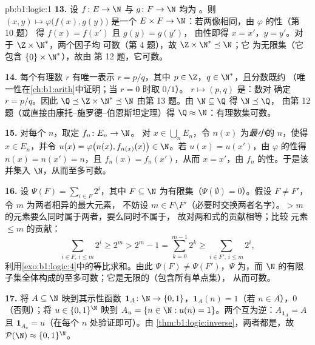 \begin{solution}{pb:b1:logic:1}
\textbf{13.} 设 $f \colon E \to \N$ 与 $g \colon F \to \N$ 均为
。则 $(x, y) \mapsto \varphi\bigl(f(x), g(y)\bigr)$ 是一个
 $E \times F \to \N$：若两像相同，由 $\varphi$ 的性（第 10 题）
得 $f(x) = f(x')$ 且 $g(y) = g(y')$，
由性即得 $x = x'$，$y = y'$。对于 $\Z \times \N^*$，两个因子均
可数（第 4 题），故 $\Z \times \N^* \preceq \N$；它
为无限集（它包含 $\{0\} \times \N^*$），故由
第 12 题，它可数。

\textbf{14.} 每个有理数 $r$ 有唯一表示 $r =
p/q$，其中 $p \in \Z$，$q \in \N^*$，且分数既约
（唯一性在\cref{ch:b1:arith}中证明；当 $r = 0$ 时取
$0/1$）。 $r \mapsto (p, q)$ 是：数对
确定 $r = p/q$。因此 $\Q \preceq \Z \times \N^* \preceq \N$
由第 13 题。由 $\N \subseteq \Q$ 得 $\N \preceq \Q$，
由第 12 题（或直接由康托–施罗德–伯恩斯坦定理）得 $\Q
\approx \N$：有理数集可数。

\textbf{15.} 对每个 $n$，取定 $f_n \colon E_n \to \N$。
对 $x \in \bigcup_n E_n$，令 $n(x)$ 为\emph{最小}的 $n$，使得
$x \in E_n$，并令 $u(x) = \varphi\bigl(n(x), f_{n(x)}(x)\bigr)
\in \N$。若 $u(x) = u(x')$，由 $\varphi$ 的性得 $n(x) =
n(x') = n$，且 $f_n(x) = f_n(x')$，从而
$x = x'$，由 $f_n$ 的性。于是该并集入 $\N$，从而至多可数。

\textbf{16.} 设 $\Psi(F) = \sum_{i \in F} 2^i$，其中 $F \subseteq \N$
为有限集（$\Psi(\emptyset) = 0$）。假设 $F \neq F'$，令 $m$ 为两者相异的最大元素，
不妨设 $m \in F \setminus
F'$（必要时交换两者名字）。$> m$ 的元素要么同时属于两者，要么同时不属于，
故对两和式的贡献相等；比较
元素 $\leq m$ 的贡献：
\[
\sum_{i \in F,\, i \leq m} 2^i \geq 2^m
> 2^m - 1 = \sum_{k=0}^{m-1} 2^k
\geq \sum_{i \in F',\, i \leq m} 2^i ,
\]
利用\cref{exo:b1:logic:4}中的等比求和。由此 $\Psi(F)
\neq \Psi(F')$，$\Psi$ 为，而
$\N$ 的有限子集全体构成的至多可数；它是无限的（包含所有单点集），
从而可数。

\textbf{17.} 将 $A \subseteq \N$ 映到其示性函数 $\mathbf 1_A
\colon \N \to \{0,1\}$，$\mathbf 1_A(n) = 1$（若 $n \in A$），$0$
（否则）；将 $u \in \{0,1\}^{\N}$ 映到 $A_u = \{n \in \N : u(n) =
1\}$。两个互为逆：$A_{\mathbf 1_A} = A$ 且
$\mathbf 1_{A_u} = u$（在每个 $n$ 处验证即可）。由
\cref{thm:b1:logic:inverse}，两者都是，故 $\mathcal{P}(\N)
\approx \{0,1\}^{\N}$。


\end{solution}
